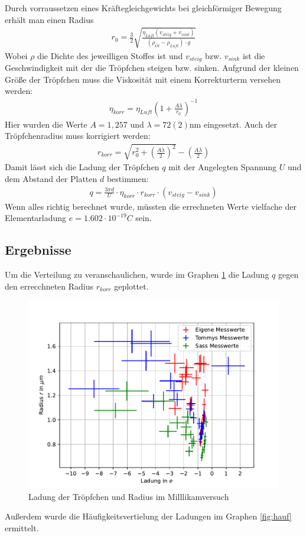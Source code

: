 \documentclass[11pt, a4paper]{article}
\begin{document}
    Durch vorraussetzen eines Kräftegleichgewichts bei gleichförmiger Bewegung erhält man einen Radius
    \begin{align}
        r_0 = \frac{3}{2} \sqrt{\frac{\eta_{Luft} (v_{steig} + v_{sink})}{(\rho_{\ddot{Ol}} - \rho_{Luft}) \cdot g}}%
    \end{align}
    Wobei $\rho$ die Dichte des jeweilligen Stoffes ist und $v_{steig}$ bzw. $v_{sink}$ ist die Geschwindigkeit mit der die Tröpfchen steigen bzw. sinken. Aufgrund der kleinen Größe der Tröpfchen muss die Viskosität mit einem Korrekturterm versehen werden:
    \begin{align}
        \eta_{korr} = \eta_{Luft}\left(1+\frac{A \lambda}{r_0}\right)^{-1}
    \end{align}
    Hier wurden die Werte $A = 1,257$ und $\lambda = 72(2) \si{\nano\metre}$ eingesetzt.
    Auch der Tröpfchenradius muss korrigiert werden:
    \begin{align}
        r_{korr} = \sqrt{r_0^2 + \left(\frac{A \lambda}{2}\right)^2} - \left(\frac{A \lambda}{2}\right)
    \end{align}
    Damit lässt sich die Ladung der Tröpfchen $q$ mit der Angelegten Spannung $U$ und dem Abstand der Platten $d$ bestimmen:
    \begin{align}
        q = \frac{3 \pi d}{U} \cdot \eta_{korr} \cdot r_{korr} \cdot \left(v_{steig} - v_{sink}\right)
    \end{align}
    Wenn alles richtig berechnet wurde, müssten die errechneten Werte vielfache der Elementarladung $e = 1.602 \cdot 10^{-19} \si{C}$ sein.

    \subsection{Ergebnisse}
    Um die Verteilung zu veranschaulichen, wurde im Graphen \ref{fig:milllikam} die Ladung $q$ gegen den errecchneten Radius $r_{korr}$ geplottet.
    \begin{figure}[h]
        \centering
        \includegraphics[width=\textwidth]{millikan.pdf}
        \caption{Ladung der Tröpfchen und Radius im Milllikamversuch}
        \label{fig:milllikam}
    \end{figure}
    Außerdem wurde die Häufigkeitsvertielung der Ladungen im Graphen \ref{fig:hauf} ermittelt.
\end{document}
